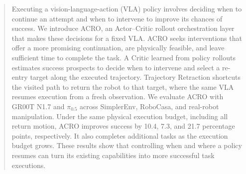 \begin{abstract}
Executing a vision-language-action (VLA) policy involves deciding when to continue an attempt and when to intervene to improve its chances of success. We introduce ACRO, an Actor--Critic rollout orchestration layer that makes these decisions for a fixed VLA. ACRO seeks interventions that offer a more promising continuation, are physically feasible, and leave sufficient time to complete the task. A Critic learned from policy rollouts estimates success prospects to decide when to intervene and select a re-entry target along the executed trajectory. Trajectory Retraction shortcuts the visited path to return the robot to that target, where the same VLA resumes execution from a fresh observation. We evaluate ACRO with GR00T N1.7 and $\pi_{0.5}$ across SimplerEnv, RoboCasa, and real-robot manipulation. Under the same physical execution budget, including all return motion, ACRO improves success by 10.4, 7.3, and 21.7 percentage points, respectively. It also completes additional tasks as the execution budget grows. These results show that controlling when and where a policy resumes can turn its existing capabilities into more successful task executions.
\end{abstract}
